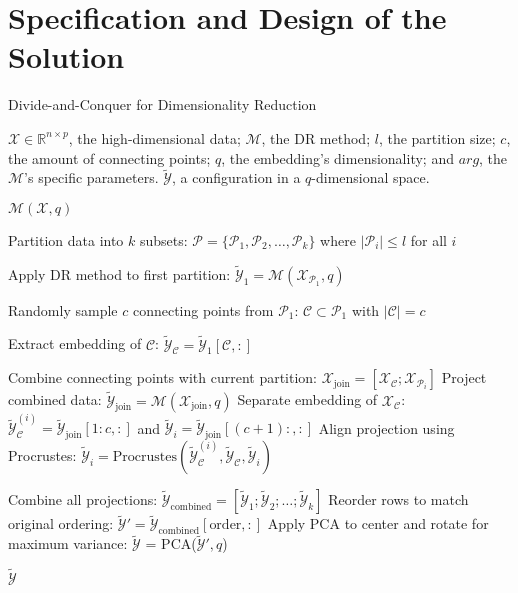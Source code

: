 \section{Specification and Design of the Solution}

\begin{algorithm}
    \caption{Divide-and-Conquer for Dimensionality Reduction}
    \label{alg:DivideConquer}
    
    \begin{algorithmic}[1]
    \REQUIRE $\mathcal{X} \in \mathbb{R}^{n \times p}$, the high-dimensional data; $\mathcal{M}$, the DR method; $l$, the partition size; $c$, the amount of connecting points; $q$, the embedding's dimensionality; and $arg$, the $\mathcal{M}$'s specific parameters.
    \ENSURE $\tilde{\mathcal{Y}}$, a configuration in a $q$-dimensional space.
    
        \RETURN $\mathcal{M}(\mathcal{X}, q)$
    \ENDIF
    
    \STATE Partition data into $k$ subsets: $\mathcal{P} = \{\mathcal{P}_1, \mathcal{P}_2, \ldots, \mathcal{P}_k\}$ where $|\mathcal{P}_i| \leq l$ for all $i$
    
    \STATE Apply DR method to first partition: $\tilde{\mathcal{Y}}_1 = \mathcal{M}(\mathcal{X}_{\mathcal{P}_1}, q)$
    
    \STATE Randomly sample $c$ connecting points from $\mathcal{P}_1$: $\mathcal{C} \subset \mathcal{P}_1$ with $|\mathcal{C}| = c$

    \STATE Extract embedding of $\mathcal{C}$: $\tilde{\mathcal{Y}}_\mathcal{C} = \tilde{\mathcal{Y}}_1[{\mathcal{C}},:]$
    
        \STATE Combine connecting points with current partition: $\mathcal{X}_{\text{join}} = [\mathcal{X}_{\mathcal{C}}; \mathcal{X}_{\mathcal{P}_i}]$
        \STATE Project combined data: $\tilde{\mathcal{Y}}_{\text{join}} = \mathcal{M}(\mathcal{X}_{\text{join}}, q)$
        \STATE Separate embedding of $\mathcal{X}_{\mathcal{C}}$: $\tilde{\mathcal{Y}}_{\mathcal{C}}^{(i)} = \tilde{\mathcal{Y}}_{\text{join}}[1:c,:]$ and $\tilde{\mathcal{Y}}_i = \tilde{\mathcal{Y}}_{\text{join}}[(c+1):,:]$
        \STATE Align projection using Procrustes: $\tilde{\mathcal{Y}}_i = \text{Procrustes}(\tilde{\mathcal{Y}}_{\mathcal{C}}^{(i)}, \tilde{\mathcal{Y}}_\mathcal{C}, \tilde{\mathcal{Y}}_i)$
    \ENDFOR
    
    \STATE Combine all projections: $\tilde{\mathcal{Y}}_{\text{combined}} = [\tilde{\mathcal{Y}}_1; \tilde{\mathcal{Y}}_2; \ldots; \tilde{\mathcal{Y}}_k]$
    \STATE Reorder rows to match original ordering: $\tilde{\mathcal{Y}}' = \tilde{\mathcal{Y}}_{\text{combined}}[\text{order},:]$
    \STATE Apply PCA to center and rotate for maximum variance: $\tilde{\mathcal{Y}}$ = PCA($\tilde{\mathcal{Y}}', q$)
    
    \RETURN $\tilde{\mathcal{Y}}$
    \end{algorithmic}
\end{algorithm}